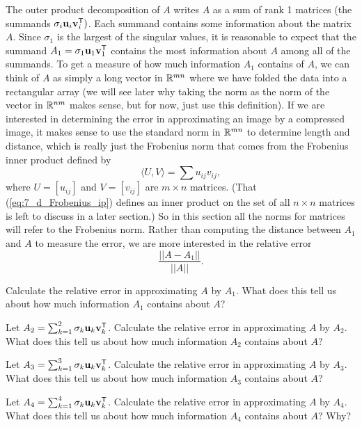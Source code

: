 \begin{pa}
	\item The outer product decomposition of $A$ writes $A$ as a sum of rank 1 matrices (the summands $\sigma_i \mathbf{u}_i \mathbf{v}_i^{\mathsf{T}})$. Each summand contains some information about the matrix $A$. Since $\sigma_1$ is the largest of the singular values, it is reasonable to expect that the summand $A_1 = \sigma_1 \mathbf{u}_1  \mathbf{v}_1^{\mathsf{T}}$ contains the most information about $A$ among all of the summands. To get a measure of how much information $A_1$ contains of $A$, we can think of $A$ as simply a long vector in $\mathbb{R}^{mn}$ where we have folded the data into a rectangular array (we will see later why taking the norm as the norm of the vector in $\mathbb{R}^{nm}$ makes sense, but for now, just use this definition). If we are interested in determining the error in approximating an image by a compressed image, it makes sense to use the standard norm in $\mathbb{R}^{mn}$ to determine length and distance, which is really just the Frobenius norm that comes from the Frobenius inner product defined by
\begin{equation} \label{eq:7_d_Frobenius_ip}
\langle U,V \rangle = \sum u_{ij}v_{ij},
\end{equation}
where $U = [u_{ij}]$ and $V = [v_{ij}]$ are $m \times n$ matrices. (That (\ref{eq:7_d_Frobenius_ip}) defines an inner product on the set of all $n \times n$ matrices is left to discuss in a later section.) So in this section all the norms for matrices will refer to the Frobenius norm. Rather than computing the distance between $A_1$ and $A$ to measure the error, we are more interested in the relative error
\[\frac{||A-A_1||}{||A||}.\]
	\ba
	\item Calculate the relative error in approximating $A$ by $A_1$. What does this tell us about how much information $A_1$ contains about $A$? 
	
	\item Let $A_2 = \sum_{k=1}^2 \sigma_k \mathbf{u}_k \mathbf{v}_k^{\mathsf{T}}$. Calculate the relative error in approximating $A$ by $A_2$. What does this tell us about how much information $A_2$ contains about $A$? 
	

	\item Let $A_3 =  \sum_{k=1}^3 \sigma_k \mathbf{u}_k \mathbf{v}_k^{\mathsf{T}}$. Calculate the relative error in approximating $A$ by $A_3$. What does this tell us about how much information $A_3$ contains about $A$? 
	
	\item Let $A_4 =  \sum_{k=1}^4 \sigma_k \mathbf{u}_k \mathbf{v}_k^{\mathsf{T}}$. Calculate the relative error in approximating $A$ by $A_4$. What does this tell us about how much information $A_4$ contains about $A$? Why?

		\ea
	\ee
\end{pa}

